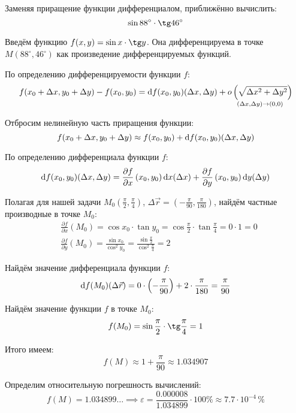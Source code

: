 \begin{problem}
Заменяя приращение функции дифференциалом, приближённо вычислить:
\[ \sin 88^{\circ}\cdot\tg 46^{\circ} \]
\end{problem}

\begin{solution}
  Введём функцию \( f(x,y)=\sin x\cdot\tg y \). Она дифференцируема в точке \( M(88^{\circ},46^{\circ}) \) как произведение дифференцируемых функций.

  По определению дифференцируемости функции \( f \):
  \[ f(x_0+\Delta x,y_0+\Delta y)-f(x_0,y_0)=\mathrm{d} f(x_0,y_0)(\Delta x,\Delta y)+\underset{(\Delta x,\Delta y)\to (0,0)}{o\left(\sqrt{\Delta x^2+\Delta y^2}\right)} \]
  
  Отбросим нелинейную часть приращения функции:
  \[ f(x_0+\Delta x,y_0+\Delta y)\approx f(x_0,y_0)+\mathrm{d} f(x_0,y_0)(\Delta x,\Delta y) \]
  
  По определению дифференциала функции \( f \):
  \[ \mathrm{d} f(x_0,y_0)(\Delta x,\Delta y)=\dfrac{\partial f}{\partial x}\left(x_0,y_0\right)\mathrm{d} x(\Delta x)+\dfrac{\partial f}{\partial y}\left(x_0,y_0\right)\mathrm{d} y(\Delta y) \]
  
  Полагая для нашей задачи \( M_0\left(\frac{\pi}{2},\frac{\pi}{4}\right) \), \( \Delta\vec{r}=\left(-\frac{\pi}{90},\frac{\pi}{180}\right) \), найдём частные производные в точке \( M_0 \):
  \begin{align*}
  &\frac{\partial f}{\partial x}(M_0) = \cos x_0 \cdot \tan y_0 = \cos\frac{\pi}{2} \cdot \tan\frac{\pi}{4} = 0 \cdot 1 = 0 \\
  &\frac{\partial f}{\partial y}(M_0) = \frac{\sin x_0}{\cos^2 y_0} = \frac{\sin\frac{\pi}{2}}{\cos^2\frac{\pi}{4}}= 2
  \end{align*}
  
  Найдём значение дифференциала функции \( f \):
  \[ \mathrm{d} f(M_0)(\Delta\vec{r})=0\cdot\left(-\dfrac{\pi}{90}\right)+2\cdot\dfrac{\pi}{180}=\dfrac{\pi}{90} \]
  
  Найдём значение функции \( f \) в точке \( M_0 \):
  \[ f(M_0)=\sin\frac{\pi}{2}\cdot\tg\frac{\pi}{4}=1 \]
  
  Итого имеем:
  \[ f(M)\approx 1+\dfrac{\pi}{90}\approx 1.034907 \]
  
  Определим относительную погрешность вычислений:
  \[ f(M)=1.034899\ldots\implies\varepsilon=\dfrac{0.000008}{1.034899}\cdot 100\%\approx 7.7\cdot 10^{-4}\,\% \]
\end{solution}